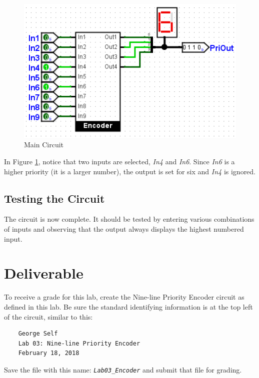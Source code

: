 \begin{figure}[H]
	\centering
	\includegraphics[width=\maxwidth{.95\linewidth}]{gfx/03-06}
	\caption{Main Circuit}
	\label{fig:03-06}
\end{figure}

In Figure \ref{fig:03-06}, notice that two inputs are selected, \textit{In4} and \textit{In6}. Since \textit{In6} is a higher priority (it is a larger number), the output is set for six and \textit{In4} is ignored.

\subsection{Testing the Circuit}

The circuit is now complete. It should be tested by entering various combinations of inputs and observing that the output always displays the highest numbered input. 

\section{Deliverable}

To receive a grade for this lab, create the Nine-line Priority Encoder circuit as defined in this lab. Be sure the standard identifying information is at the top left of the circuit, similar to this:

\bigskip
\begin{minipage}{\linewidth}
	\begin{verbatim}
	George Self
	Lab 03: Nine-line Priority Encoder
	February 18, 2018
	\end{verbatim}
\end{minipage}
\bigskip

Save the file with this name: \emph{\texttt{Lab03\_Encoder}} and submit that file for grading.